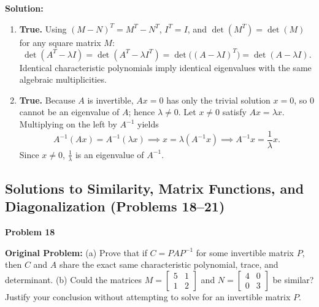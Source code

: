 \documentclass[11pt, letterpaper]{article}
\theoremstyle{definition}
\theoremstyle{remark}
\begin{document}
\textbf{Solution:}
\begin{enumerate}[label=(\alph*), topsep=3pt, itemsep=4pt]
    \item \textbf{True.} Using $(M - N)^T = M^T - N^T$, $I^T = I$, and $\det(M^T) = \det(M)$ for any square matrix $M$:
    \[
    \det(A^T - \lambda I) = \det(A^T - \lambda I^T) = \det\big((A - \lambda I)^T\big) = \det(A - \lambda I).
    \]
    Identical characteristic polynomials imply identical eigenvalues with the same algebraic multiplicities.
    \item \textbf{True.} Because $A$ is invertible, $Ax = 0$ has only the trivial solution $x = 0$, so $0$ cannot be an eigenvalue of $A$; hence $\lambda \neq 0$. Let $x \neq 0$ satisfy $Ax = \lambda x$. Multiplying on the left by $A^{-1}$ yields
    \[
    A^{-1}(Ax) = A^{-1}(\lambda x) \implies x = \lambda(A^{-1}x) \implies A^{-1}x = \frac{1}{\lambda}x.
    \]
    Since $x \neq 0$, $\frac{1}{\lambda}$ is an eigenvalue of $A^{-1}$.
\end{enumerate}

\subsection{Solutions to Similarity, Matrix Functions, and Diagonalization (Problems 18--21)}

\noindent\textbf{Problem 18}

\textbf{Original Problem:} (a) Prove that if $C = PAP^{-1}$ for some invertible matrix $P$, then $C$ and $A$ share the exact same characteristic polynomial, trace, and determinant. (b) Could the matrices $M = \begin{bmatrix} 5 & 1 \\ 1 & 2 \end{bmatrix}$ and $N = \begin{bmatrix} 4 & 0 \\ 0 & 3 \end{bmatrix}$ be similar? Justify your conclusion without attempting to solve for an invertible matrix $P$.
\end{document}
